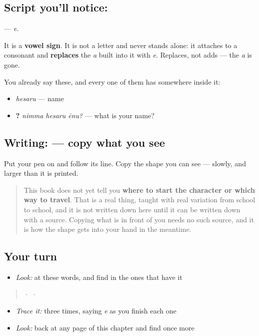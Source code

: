 \subsection*{Script you'll notice: }
\textbf{} — \emph{e}.

It is a \textbf{vowel sign}. It is not a letter and never stands alone: it attaches to a consonant and \textbf{replaces} the \emph{a} built into it with \emph{e}. Replaces, not adds — the \emph{a} is gone.

You already say these, and every one of them has  somewhere inside it:

\begin{itemize}
\raggedright
  \item \textbf{} \emph{hesaru} — name
  \item \textbf{  ?} \emph{nimma hesaru ēnu?} — what is your name?
\end{itemize}

\subsection*{Writing:  — copy what you see}
Put your pen on  and follow its line. Copy the shape you can see — slowly, and larger than it is printed.

\begin{quote}
This book does not yet tell you \textbf{where to start the character or which way to travel}. That is a real thing, taught with real variation from school to school, and it is not written down here until it can be written down with a source. Copying what is in front of you needs no such source, and it is how the shape gets into your hand in the meantime.
\end{quote}

\subsection*{Your turn}
\begin{itemize}
\raggedright
  \item \emph{Look:} at these words, and find  in the ones that have it
\end{itemize}

\begin{quote}
  ·    ·  
\end{quote}

\begin{itemize}
\raggedright
  \item \emph{Trace it:}  three times, saying \emph{e} as you finish each one
  \item \emph{Look:} back at any page of this chapter and find  once more
\end{itemize}

